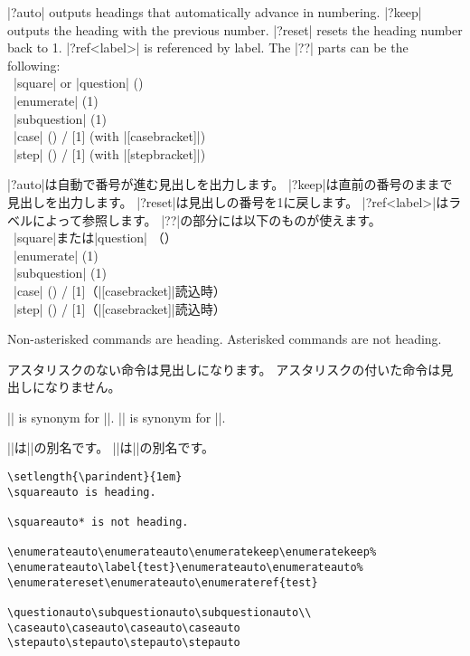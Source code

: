 \documentclass[%
fleqn,%
paper=a4paper,%
fontsize=10pt,%
open_bracket_pos=zenkakunibu_nibu,%
hanging_punctuation,%
]%
{jlreq}
\newenvironment{translateing}%
{\begin{multicolpar}{2}}
{\end{multicolpar}\vspace{\baselineskip}}
\DeclareRobustCommand{\commandtojskip}{\hspace{2.40554pt plus 1.49994pt minus 0.59998pt}}
\begin{document}
\begin{translateing}
|\??auto| outputs headings that automatically advance in numbering.
|\??keep| outputs the heading with the previous number.
|\??reset| resets the heading number back to 1.
|\??ref{<label>}| is referenced by label.
The |??| parts can be the following:\\
\textbullet\ |square| or |question| ()\\
\textbullet\ |enumerate| (1)\\
\textbullet\ |subquestion| (1)\\
\textbullet\ |case| () / [1] (with |[casebracket]|)\\
\textbullet\ |step| () / [1] (with |[stepbracket]|)

|\??auto|は自動で番号が進む見出しを出力します。
|\??keep|は直前の番号のままで見出しを出力します。
|\??reset|は見出しの番号を1に戻します。
|\??ref{<label>}|\commandtojskip はラベルによって参照します。
|??|の部分には以下のものが使えます。\\
\textbullet\ |square|または|question| （）\\
\textbullet\ |enumerate| (1)\\
\textbullet\ |subquestion| (1)\\
\textbullet\ |case| () / [1]（|[casebracket]|読込時）\\
\textbullet\ |step| () / [1]（|[casebracket]|読込時）

Non-asterisked commands are heading.
Asterisked commands are not heading.

アスタリスクのない命令は見出しになります。
アスタリスクの付いた命令は見出しになりません。

|\case| is synonym for |\caseauto|.
|\step| is synonym for |\stepauto|.

|\case|は\commandtojskip|\caseauto|の別名です。
|\step|は\commandtojskip|\stepauto|の別名です。
\end{translateing}

\begin{lstlisting}
\setlength{\parindent}{1em}
\squareauto is heading.

\squareauto* is not heading.

\enumerateauto\enumerateauto\enumeratekeep\enumeratekeep%
\enumerateauto\label{test}\enumerateauto\enumerateauto%
\enumeratereset\enumerateauto\enumerateref{test}

\questionauto\subquestionauto\subquestionauto\\
\caseauto\caseauto\caseauto\caseauto
\stepauto\stepauto\stepauto\stepauto
\end{lstlisting}
\end{document}

